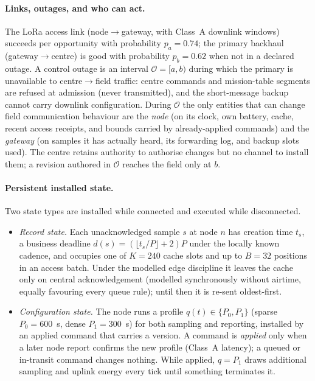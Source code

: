 \documentclass[11pt]{article}
\begin{document}
\paragraph{Links, outages, and who can act.}
The LoRa access link (node$\to$gateway, with Class~A downlink windows) succeeds per opportunity
with probability $p_a{=}0.74$; the primary backhaul (gateway$\to$centre) is good with probability
$p_b{=}0.62$ when not in a declared outage. A control outage is an interval
$\mathcal O=[a,b)$ during which the primary is unavailable to centre$\to$field traffic: centre
commands and mission-table segments are refused at admission (never transmitted), and the
short-message backup cannot carry downlink configuration. During $\mathcal O$ the only entities
that can change field communication behaviour are the \emph{node} (on its clock, own battery,
cache, recent access receipts, and bounds carried by already-applied commands) and the
\emph{gateway} (on samples it has actually heard, its forwarding log, and backup slots used). The
centre retains authority to authorise changes but no channel to install them; a revision authored
in $\mathcal O$ reaches the field only at $b$.

\paragraph{Persistent installed state.}
Two state types are installed while connected and executed while disconnected.
\begin{itemize}[leftmargin=*,itemsep=1pt,nosep]
\item \emph{Record state.} Each unacknowledged sample $s$ at node $n$ has creation time
$t_s$, a business deadline $d(s)=(\lfloor t_s/P\rfloor+2)P$ under the locally known cadence, and
occupies one of $K{=}240$ cache slots and up to $B{=}32$ positions in an access batch. Under the
modelled edge discipline it leaves the cache only on central acknowledgement (modelled
synchronously without airtime, equally favouring every queue rule); until then it is re-sent
oldest-first.
\item \emph{Configuration state.} The node runs a profile $q(t)\in\{P_0,P_1\}$ (sparse
$P_0{=}600$~s, dense $P_1{=}300$~s) for both sampling and reporting, installed by an applied
command that carries a version. A command is \emph{applied} only when a later node report confirms
the new profile (Class~A latency); a queued or in-transit command changes nothing. While applied,
$q{=}P_1$ draws additional sampling and uplink energy every tick until something terminates it.
\end{itemize}
\end{document}
